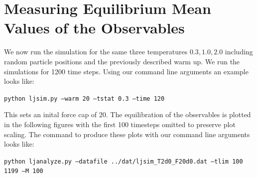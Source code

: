 \section{Measuring Equilibrium Mean Values of the Observables}
We now run the simulation for the same three temperatures ${0.3, 1.0, 2.0}$ including random particle positions and the previously described warm up. We run the simulations for 1200 time steps. Using our command line arguments an example looks like:

{\tt python ljsim.py --warm 20 --tstat 0.3 --time 120}

This sets an inital force cap of 20. The equilibration of the observables is plotted in the following figures with the first 100 timesteps omitted to preserve plot scaling. The command to produce these plots with our command line arguments looks like:

{\tt python ljanalyze.py --datafile ../dat/ljsim\_T2d0\_F20d0.dat --tlim 100 1199 --M 100}

